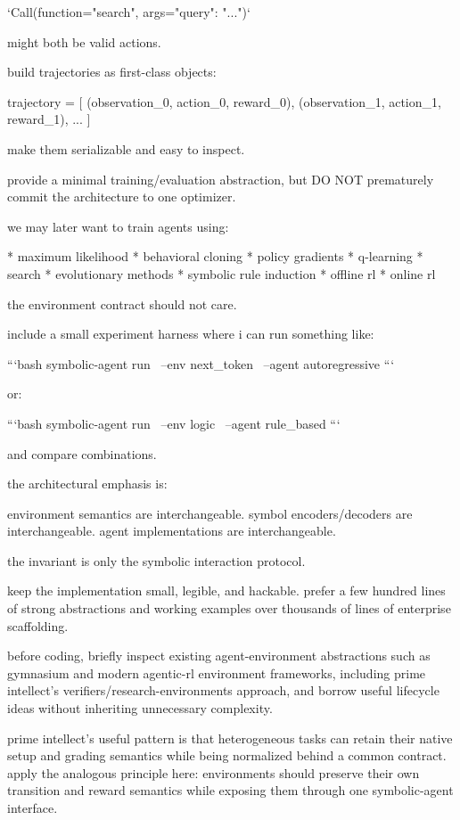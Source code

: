`Call(function="search", args={"query": "..."})`

might both be valid actions.

build trajectories as first-class objects:

trajectory = [
(observation_0, action_0, reward_0),
(observation_1, action_1, reward_1),
...
]

make them serializable and easy to inspect.

provide a minimal training/evaluation abstraction, but DO NOT prematurely commit the architecture to one optimizer.

we may later want to train agents using:

* maximum likelihood
* behavioral cloning
* policy gradients
* q-learning
* search
* evolutionary methods
* symbolic rule induction
* offline rl
* online rl

the environment contract should not care.

include a small experiment harness where i can run something like:

```bash
symbolic-agent run \
  --env next_token \
  --agent autoregressive
```

or:

```bash
symbolic-agent run \
  --env logic \
  --agent rule_based
```

and compare combinations.

the architectural emphasis is:

environment semantics are interchangeable.
symbol encoders/decoders are interchangeable.
agent implementations are interchangeable.

the invariant is only the symbolic interaction protocol.

keep the implementation small, legible, and hackable. prefer a few hundred lines of strong abstractions and working examples over thousands of lines of enterprise scaffolding.

before coding, briefly inspect existing agent-environment abstractions such as gymnasium and modern agentic-rl environment frameworks, including prime intellect's verifiers/research-environments approach, and borrow useful lifecycle ideas without inheriting unnecessary complexity.

prime intellect's useful pattern is that heterogeneous tasks can retain their native setup and grading semantics while being normalized behind a common contract. apply the analogous principle here: environments should preserve their own transition and reward semantics while exposing them through one symbolic-agent interface.

